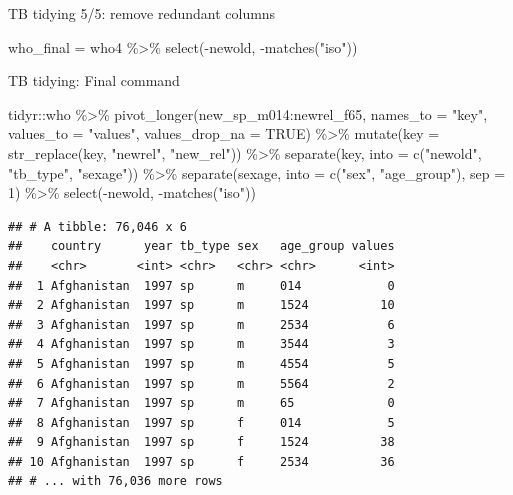 \documentclass[
  ignorenonframetext,
]{beamer}
\newenvironment{Shaded}{\begin{snugshade}}{\end{snugshade}}
\newcommand{\AttributeTok}[1]{\textcolor[rgb]{0.77,0.63,0.00}{#1}}
\newcommand{\ConstantTok}[1]{\textcolor[rgb]{0.00,0.00,0.00}{#1}}
\newcommand{\DecValTok}[1]{\textcolor[rgb]{0.00,0.00,0.81}{#1}}
\newcommand{\FunctionTok}[1]{\textcolor[rgb]{0.00,0.00,0.00}{#1}}
\newcommand{\NormalTok}[1]{#1}
\newcommand{\OtherTok}[1]{\textcolor[rgb]{0.56,0.35,0.01}{#1}}
\newcommand{\SpecialCharTok}[1]{\textcolor[rgb]{0.00,0.00,0.00}{#1}}
\newcommand{\StringTok}[1]{\textcolor[rgb]{0.31,0.60,0.02}{#1}}
\begin{document}
\begin{frame}[fragile]{TB tidying 5/5: remove redundant columns}
\protect\hypertarget{tb-tidying-55-remove-redundant-columns}{}
\begin{Shaded}
\begin{Highlighting}[]
\NormalTok{who\_final }\OtherTok{=}\NormalTok{ who4 }\SpecialCharTok{\%\textgreater{}\%} 
  \FunctionTok{select}\NormalTok{(}\SpecialCharTok{{-}}\NormalTok{newold, }\SpecialCharTok{{-}}\FunctionTok{matches}\NormalTok{(}\StringTok{"iso"}\NormalTok{))}
\end{Highlighting}
\end{Shaded}
\end{frame}

\begin{frame}[fragile]{TB tidying: Final command}
\protect\hypertarget{tb-tidying-final-command}{}
\begin{Shaded}
\begin{Highlighting}[]
\NormalTok{tidyr}\SpecialCharTok{::}\NormalTok{who }\SpecialCharTok{\%\textgreater{}\%} 
  \FunctionTok{pivot\_longer}\NormalTok{(new\_sp\_m014}\SpecialCharTok{:}\NormalTok{newrel\_f65, }
               \AttributeTok{names\_to =} \StringTok{"key"}\NormalTok{, }
               \AttributeTok{values\_to =} \StringTok{"values"}\NormalTok{, }
               \AttributeTok{values\_drop\_na =} \ConstantTok{TRUE}\NormalTok{) }\SpecialCharTok{\%\textgreater{}\%}
  \FunctionTok{mutate}\NormalTok{(}\AttributeTok{key =} \FunctionTok{str\_replace}\NormalTok{(key, }\StringTok{"newrel"}\NormalTok{, }\StringTok{"new\_rel"}\NormalTok{)) }\SpecialCharTok{\%\textgreater{}\%}
  \FunctionTok{separate}\NormalTok{(key, }\AttributeTok{into =} \FunctionTok{c}\NormalTok{(}\StringTok{"newold"}\NormalTok{, }\StringTok{"tb\_type"}\NormalTok{, }\StringTok{"sexage"}\NormalTok{)) }\SpecialCharTok{\%\textgreater{}\%} 
  \FunctionTok{separate}\NormalTok{(sexage, }\AttributeTok{into =} \FunctionTok{c}\NormalTok{(}\StringTok{"sex"}\NormalTok{, }\StringTok{"age\_group"}\NormalTok{), }\AttributeTok{sep =} \DecValTok{1}\NormalTok{) }\SpecialCharTok{\%\textgreater{}\%} 
  \FunctionTok{select}\NormalTok{(}\SpecialCharTok{{-}}\NormalTok{newold, }\SpecialCharTok{{-}}\FunctionTok{matches}\NormalTok{(}\StringTok{"iso"}\NormalTok{))}
\end{Highlighting}
\end{Shaded}

\begin{verbatim}
## # A tibble: 76,046 x 6
##    country      year tb_type sex   age_group values
##    <chr>       <int> <chr>   <chr> <chr>      <int>
##  1 Afghanistan  1997 sp      m     014            0
##  2 Afghanistan  1997 sp      m     1524          10
##  3 Afghanistan  1997 sp      m     2534           6
##  4 Afghanistan  1997 sp      m     3544           3
##  5 Afghanistan  1997 sp      m     4554           5
##  6 Afghanistan  1997 sp      m     5564           2
##  7 Afghanistan  1997 sp      m     65             0
##  8 Afghanistan  1997 sp      f     014            5
##  9 Afghanistan  1997 sp      f     1524          38
## 10 Afghanistan  1997 sp      f     2534          36
## # ... with 76,036 more rows
\end{verbatim}
\end{frame}
\end{document}
